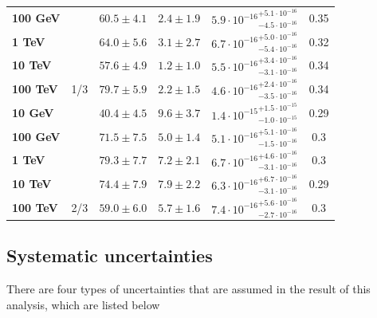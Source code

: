 \begin{table}[]
{\begin{tabular}{|l |c|c|c|c|c|}
\textbf{100 GeV} &  & $60.5\pm4.1$ & $2.4\pm1.9$ & ${ 5.9\cdot 10^{{-16}} }^{ +5.1\cdot 10^{{-16}} }_{ -4.5\cdot 10^{{-16}} }$ & 0.35 \\ \cline{3-6}
\textbf{1 TeV} &  & $64.0\pm5.6$ & $3.1\pm2.7$ & ${ 6.7\cdot 10^{{-16}} }^{ +5.0\cdot 10^{{-16}} }_{ -5.4\cdot 10^{{-16}} }$ & 0.32 \\ \cline{3-6}
\textbf{10 TeV} &  & $57.6\pm4.9$ & $1.2\pm1.0$ & ${ 5.5\cdot 10^{{-16}} }^{ +3.4\cdot 10^{{-16}} }_{ -3.1\cdot 10^{{-16}} }$ & 0.34 \\ \cline{3-6}
\textbf{100 TeV} & \multirow{-5}{*}{1/3} & $79.7\pm5.9$ & $2.2\pm1.5$ & ${ 4.6\cdot 10^{{-16}} }^{ +2.4\cdot 10^{{-16}} }_{ -3.5\cdot 10^{{-16}} }$ & 0.34 \\ \hline
\textbf{10 GeV} &  & $40.4\pm4.5$ & $9.6\pm3.7$ & ${ 1.4\cdot 10^{{-15}} }^{ +1.5\cdot 10^{{-15}} }_{ -1.0\cdot 10^{{-15}} }$ & 0.29 \\ \cline{3-6}
\textbf{100 GeV} &  & $71.5\pm7.5$ & $5.0\pm1.4$ & ${ 5.1\cdot 10^{{-16}} }^{ +5.1\cdot 10^{{-16}} }_{ -1.5\cdot 10^{{-16}} }$ & 0.3 \\ \cline{3-6}
\textbf{1 TeV} &  & $79.3\pm7.7$ & $7.2\pm2.1$ & ${ 6.7\cdot 10^{{-16}} }^{ +4.6\cdot 10^{{-16}} }_{ -3.1\cdot 10^{{-16}} }$ & 0.3 \\ \cline{3-6}
\textbf{10 TeV} &  & $74.4\pm7.9$ & $7.9\pm2.2$ & ${ 6.3\cdot 10^{{-16}} }^{ +6.7\cdot 10^{{-16}} }_{ -3.1\cdot 10^{{-16}} }$ & 0.29 \\ \cline{3-6}
\textbf{100 TeV} & \multirow{-5}{*}{2/3} & $59.0\pm6.0$ & $5.7\pm1.6$ & ${ 7.4\cdot 10^{{-16}} }^{ +5.6\cdot 10^{{-16}} }_{ -2.7\cdot 10^{{-16}} }$ & 0.3 \\ \hline
\end{tabular}%
}
\end{table}


\subsection{Systematic uncertainties}
There are four types of uncertainties that are assumed in the result of this analysis, which are listed below

